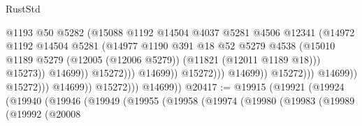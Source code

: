 \begin{lexlean}{RustStd}
\begin{coremodule}
                                                        @1193
                                                        @50
                                                        @5282
                                                        (@15088
                                                          @1192
                                                          @14504
                                                          @4037
                                                          @5281
                                                          @4506
                                                          @12341
                                                          (@14972
                                                            @1192
                                                            @14504
                                                            @5281
                                                            (@14977
                                                              @1190
                                                              @391
                                                              @18
                                                              @52
                                                              @5279
                                                              @4538
                                                              (@15010
                                                                @1189
                                                                @5279
                                                                (@12005 (@12006 @5279))
                                                                (@11821 (@12011 @1189 @18)))
                                                              @15273))
                                                          @14699))
                                                      @15272)))
                                                @14699))
                                            @15272)))
                                      @14699))
                                  @15272)))
                            @14699))
                        @15272)))
                  @14699))
              @15272)))
        @14699))
@20417 := @19915
    (@19921
      (@19924
        (@19940
          (@19946
            (@19949
              (@19955
                (@19958
                  (@19974
                    (@19980
                      (@19983
                        (@19989
                          (@19992
                            (@20008

\end{coremodule}
\end{lexlean}
